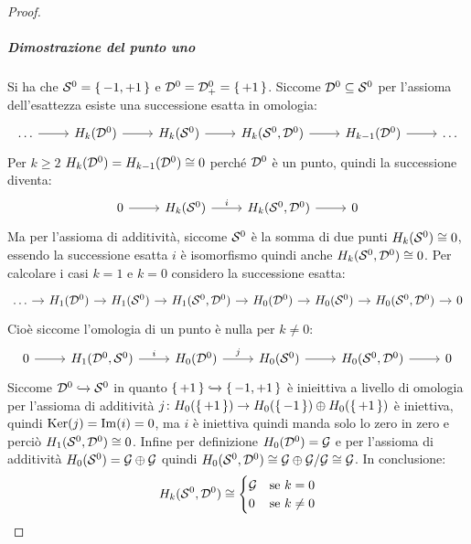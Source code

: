 \begin{proof}
  \subparagraph{Dimostrazione del punto uno}
  Si ha che $ \mathcal{S}^{0} = \set{-1, +1} $ e $ \mathcal{D}^{0} = \mathcal{D}^{0}_+ = \set{+ 1} $.
  Siccome $ \mathcal{D}^{0} \subseteq \mathcal{S}^{0} $ per l'assioma dell'esattezza esiste
  una successione esatta in omologia:
  \[
    \begin{tikzcd}
      \dots \rar & H_k(\Disk{0}) \rar & H_k(\Sph{0}) \rar & H_k(\Sph{0}, \Disk{0}) \rar & H_{k-1}(\Disk{0}) \rar & \dots
    \end{tikzcd}
  \]
  Per $ k \geq 2 $ $ H_k(\mathcal{D}^{0}) = H_{k-1}(\mathcal{D}^{0}) \cong 0 $ perché $ \mathcal{D}^{0} $ è un punto, quindi
  la successione diventa:
  \[
    \begin{tikzcd}
      0 \rar & H_k(\Sph{0}) \rar{i} & H_k(\Sph{0}, \Disk{0}) \rar{} & 0
    \end{tikzcd}
  \]
  Ma per l'assioma di additività, siccome $ \mathcal{S}^{0} $ è la somma di due punti
  $ H_k(\mathcal{S}^{0}) \cong 0 $, essendo la successione esatta
  $ i $ è isomorfismo quindi anche $ H_k(\mathcal{S}^{0}, \mathcal{D}^{0}) \cong 0 $.
  Per calcolare
  i casi $ k = 1 $ e $ k = 0 $ considero la successione esatta:
  \[
    \begin{tikzcd}[nodes={column sep=10pt, inner sep=4pt}]
      \dots \rar & H_1(\Disk{0}) \rar & H_1(\Sph{0}) \rar & H_1(\Sph{0}, \Disk{0}) \rar
      & H_0(\Disk{0}) \rar & H_{0}(\Sph{0}) \rar & H_0(\Sph{0}, \Disk{0}) \rar & 0
    \end{tikzcd}
  \]
  Cioè siccome l'omologia di un punto è nulla per $ k \not = 0 $:
  \[
    \begin{tikzcd}
       0 \rar & H_1(\Disk{0}, \Sph{0}) \rar{i}
      & H_0(\Disk{0}) \rar{j} & H_{0}(\Sph{0}) \rar & H_0(\Sph{0}, \Disk{0}) \rar & 0
    \end{tikzcd}
  \]
  Siccome $ \mathcal{D}^{0} \xhookrightarrow{} \mathcal{S}^{0} $ in quanto $ \set{+1} \xhookrightarrow{} \set{-1, +1} $ è
  inieittiva a livello di omologia per l'assioma di additività
  $ j \colon H_0(\set{+1}) \to H_0(\set{-1}) \oplus H_0(\set{+1}) $ è iniettiva, quindi
  $ \mathrm{Ker}( j) = \mathrm{Im}( i ) = 0 $, ma $ i $ è iniettiva quindi manda solo lo zero
  in zero e perciò $ H_1(\mathcal{S}^{0},\mathcal{D}^{0}) \cong 0 $.
  Infine per definizione $ H_0(\mathcal{D}^{0}) = \mathcal{G} $ e
  per l'assioma di additività $ H_0(\mathcal{S}^{0}) = \mathcal{G} \oplus \mathcal{G} $ quindi
  $ H_0(\mathcal{S}^{0}, \mathcal{D}^{0}) \cong {\mathcal{G} \oplus \mathcal{G}} \slash {\mathcal{G}} \cong \mathcal{G} $.
  In conclusione:
  \[
    H_k(\mathcal{S}^{0}, \mathcal{D}^{0}) \cong
    \begin{cases}
      \mathcal{G} & \text{se } k = 0 \\
      0 & \text{se } k \not =  0
    \end{cases}
  \]


\end{proof}
